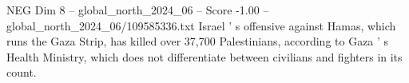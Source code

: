 \begin{textsample}{NEG Dim 8 – global\_north\_2024\_06 – Score -1.00 – global\_north\_2024\_06/109585336.txt}
Israel ' s offensive against Hamas, which runs the Gaza Strip, has killed over 37,700 Palestinians, according to Gaza ' s Health Ministry, which does not differentiate between civilians and fighters in its count.

\end{textsample}
